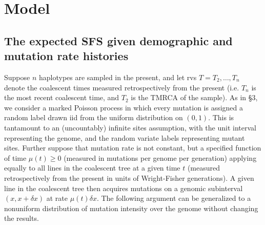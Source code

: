 \documentclass[11pt]{article}
\begin{document}
\section{Model}\label{sec:model}

\subsection{The expected SFS given demographic and mutation rate histories}\label{sec:model:xi}

Suppose $n$ haplotypes are sampled in the present, and let rvs $T = T_2,\dots,T_n$ denote the coalescent times measured retrospectively from the present (i.e. $T_n$ is the most recent coalescent time, and $T_2$ is the TMRCA of the sample).
As in \cite{Griffiths1998-qf} \S3, we consider a marked Poisson process in which every mutation is assigned a random label drawn iid from the uniform distribution on $(0,1)$.
This is tantamount to an (uncountably) infinite sites assumption, with the unit interval representing the genome, and the random variate labels representing mutant sites.
Further suppose that mutation rate is not constant, but a specified function of time $\mu(t) \ge 0$ (measured in mutations per genome per generation) applying equally to all lines in the coalescent tree at a given time $t$ (measured retrospectively from the present in units of Wright-Fisher generations).
A given line in the coalescent tree then acquires mutations on a genomic subinterval $(x,x+\delta x)$ at rate $\mu(t)\delta x$.
The following argument can be generalized to a nonuniform distribution of mutation intensity over the genome without changing the results.
\end{document}
